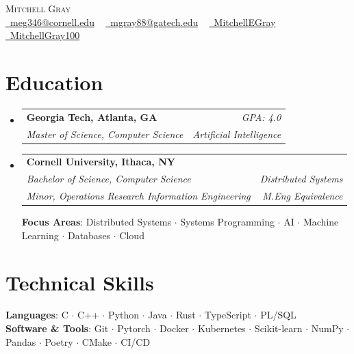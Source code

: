 \documentclass[letterpaper,11pt]{article}
\makeatletter
\newcommand{\resumeSpecialSubheadingCornell}[6]{
  \vspace{-2pt}\item
    \begin{tabular*}{1.0\textwidth}[t]{l@{\extracolsep{\fill}}r}
      \textbf{#1} & \textbf{\small #2} \\
      \textit{\small#3} & \textit{\small #4} \\
      \textit{\small#5} & \textit{\small #6} \\
    \end{tabular*}\vspace{-7pt}
}
\newcommand{\resumeSpecialSubheadingGT}[4]{
  \vspace{-2pt}\item
    \begin{tabular*}{1.0\textwidth}[t]{l@{\extracolsep{\fill}}r}
      \textbf{#1} & \textit{\small #2} \\
      \textit{\small#3} & \textit{\small #4} \\
    \end{tabular*}\vspace{-7pt}
}
\newcommand{\resumeSubHeadingListStart}{\begin{itemize}[leftmargin=0.0in, label={}]}
\newcommand{\resumeSubHeadingListEnd}{\end{itemize}}
\makeatother
\begin{document}
\begin{center}
    {\Huge \scshape Mitchell Gray} \\ \vspace{1pt}
    \small
    \href{mailto:meg346@cornell.edu}{\faEnvelope\ meg346@cornell.edu} ~ 
    \href{mailto:mgray88@gatech.edu}{\faEnvelope\ mgray88@gatech.edu} ~ 
    \href{https://www.linkedin.com/in/mitchellegray/}{\faLinkedin\ MitchellEGray}  ~
    \href{https://github.com/MitchellGray100}{\faGithub\ MitchellGray100}
\end{center}


\section{\textcolor{customred}{Education}}
  \resumeSubHeadingListStart
    \resumeSpecialSubheadingGT
      {Georgia Tech, Atlanta, GA}{GPA: 4.0}
      {Master of Science, Computer Science}{Artificial Intelligence}%


    \resumeSpecialSubheadingCornell
      {Cornell University, Ithaca, NY}{}
      {Bachelor of Science, Computer Science}{Distributed Systems}%
      {Minor, Operations Research Information Engineering}{M.Eng Equivalence}

      \vspace{2pt}
      \textbf{Focus Areas}: Distributed Systems $\cdot$ Systems Programming $\cdot$ AI $\cdot$ Machine Learning $\cdot$ Databases $\cdot$ Cloud
      
      
    \resumeSubHeadingListEnd

\section{\textcolor{customred}{Technical Skills}}
 \begin{itemize}[leftmargin=0.0in, label={}]
    \small{\item{
     \textbf{Languages}{: C $\cdot$ C++ $\cdot$ Python $\cdot$ Java $\cdot$ Rust $\cdot$ TypeScript $\cdot$ PL/SQL} \\
     \textbf{Software \& Tools}{: 
     Git $\cdot$ Pytorch $\cdot$ Docker $\cdot$ Kubernetes $\cdot$ Scikit-learn $\cdot$ NumPy $\cdot$ Pandas $\cdot$ Poetry $\cdot$ CMake $\cdot$ CI/CD
     }\\
    }}
 \end{itemize}
\end{document}

